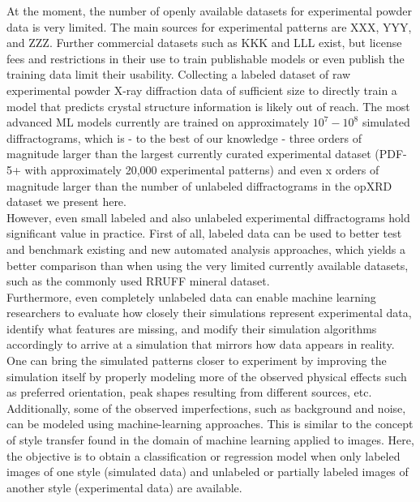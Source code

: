 At the moment, the number of openly available datasets for experimental powder data is very limited. The main sources for experimental patterns are XXX, YYY, and ZZZ. Further commercial datasets such as KKK and LLL exist, but license fees and restrictions in their use to train publishable models or even publish the training data limit their usability. Collecting a labeled dataset of raw experimental powder X-ray diffraction data of sufficient size to directly train a model that predicts crystal structure information is likely out of reach. The most advanced ML models currently are trained on approximately $10^7 - 10^8$ simulated diffractograms, which is - to the best of our knowledge - three orders of magnitude larger than the largest currently curated experimental dataset (PDF-5+ with approximately 20,000 experimental patterns) and even x orders of magnitude larger than the number of unlabeled diffractograms in the opXRD dataset we present here. \\

However, even small labeled and also unlabeled experimental diffractograms hold significant value in practice. First of all, labeled data can be used to better test and benchmark existing and new automated analysis approaches, which yields a better comparison than when using the very limited currently available datasets, such as the commonly used RRUFF mineral dataset\cite{Armbruster2015}. \\

Furthermore, even completely unlabeled data can enable machine learning researchers to evaluate how closely their simulations represent experimental data, identify what features are missing, and modify their simulation algorithms accordingly to arrive at a simulation that mirrors how data appears in reality.
One can bring the simulated patterns closer to experiment by improving the simulation itself by properly modeling more of the observed physical effects such as preferred orientation, peak shapes resulting from different sources, etc.
Additionally, some of the observed imperfections, such as background and noise, can be modeled using machine-learning approaches. This is similar to the concept of style transfer\cite{Gatys2016, Ganin2015} found in the domain of machine learning applied to images. Here, the objective is to obtain a classification or regression model when only labeled images of one style (simulated data) and unlabeled or partially labeled images of another style (experimental data) are available. \\

